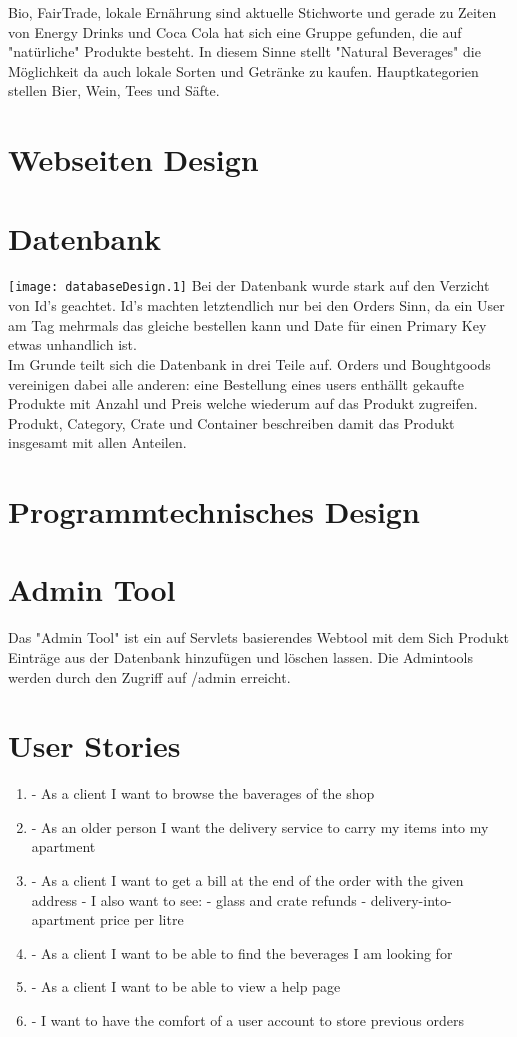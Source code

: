 \documentclass[a4paper, 11pt]{article}
\begin{document}
Bio, FairTrade, lokale Ernährung sind aktuelle Stichworte und gerade zu Zeiten von Energy Drinks und Coca Cola hat sich eine Gruppe gefunden, die auf "natürliche" Produkte besteht. In diesem Sinne stellt "Natural Beverages" die Möglichkeit da auch lokale Sorten und Getränke zu kaufen. Hauptkategorien stellen Bier, Wein, Tees und Säfte.  
\section{Webseiten Design}

\section{Datenbank}
\texttt{[image: databaseDesign.1]}
Bei der Datenbank wurde stark auf den Verzicht von Id's geachtet. Id's machten letztendlich nur bei den Orders Sinn, da ein User am Tag mehrmals das gleiche bestellen kann und Date für einen Primary Key etwas unhandlich ist. \\
Im Grunde teilt sich die Datenbank in drei Teile auf. Orders und Boughtgoods vereinigen dabei alle anderen: eine Bestellung eines users enthällt gekaufte Produkte mit Anzahl und Preis welche wiederum auf das Produkt zugreifen. Produkt, Category, Crate und Container beschreiben damit das Produkt insgesamt mit allen Anteilen.
\section{Programmtechnisches Design}

\section{Admin Tool}
Das "Admin Tool" ist ein auf Servlets basierendes Webtool mit dem Sich Produkt Einträge aus der Datenbank hinzufügen und löschen lassen. Die Admintools werden durch den Zugriff auf /admin erreicht. 

\section{User Stories}
\begin{enumerate}
	\item- As a client I want to browse the baverages of the shop
	\item- As an older person I want the delivery service to carry my items into my apartment
	\item- As a client I want to get a bill at the end of the order with the given address
		- I also want to see:
			- glass and crate refunds
			- delivery-into-apartment price per litre
	\item- As a client I want to be able to find the beverages I am looking for
	\item- As a client I want to be able to view a help page
	\item- I want to have the comfort of a user account to store previous orders
	\end{enumerate}
\end{document}
